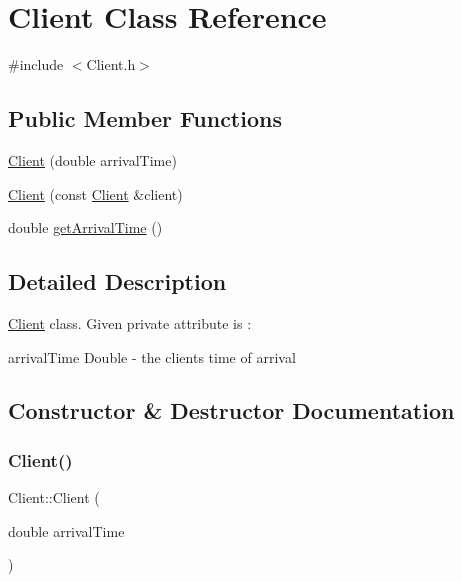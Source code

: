 \hypertarget{classClient}{}\section{Client Class Reference}
\label{classClient}


{\ttfamily \#include $<$Client.\+h$>$}

\subsection*{Public Member Functions}
\begin{DoxyCompactItemize}
\item 
\hyperlink{classClient_a1540718bfe0d1c040821fc2f4598dea1}{Client} (double arrival\+Time)
\item 
\hyperlink{classClient_ab74cbe8124ada5342d56030bd608876b}{Client} (const \hyperlink{classClient}{Client} \&client)
\item 
double \hyperlink{classClient_a748d86e8c875f10a5d92c3cf2a12e621}{get\+Arrival\+Time} ()
\end{DoxyCompactItemize}


\subsection{Detailed Description}
\hyperlink{classClient}{Client} class. Given private attribute is \+:
\begin{DoxyItemize}
\item arrival\+Time Double -\/ the client\textquotesingle{}s time of arrival 
\end{DoxyItemize}

\subsection{Constructor \& Destructor Documentation}
\mbox{\label{classClient_a1540718bfe0d1c040821fc2f4598dea1}} 
\subsubsection{\texorpdfstring{Client()}{Client()}\hspace{0.1cm}{\footnotesize\ttfamily [1/2]}}
{\footnotesize\ttfamily Client\+::\+Client (\begin{DoxyParamCaption}\item[{double}]{arrival\+Time }\end{DoxyParamCaption})\hspace{0.3cm}{\ttfamily [explicit]}}

